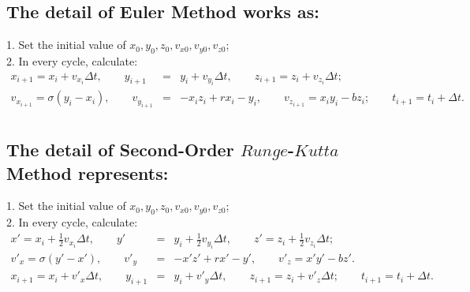 \documentclass{article}
\begin{document}
\subsection{The detail of Euler Method works as:}
1. Set the initial value of $x_0,y_0,z_0,v_{x0},v_{y0},v_{z0}$;\\
2. In every cycle, calculate:
\begin{eqnarray*}
x_{i+1} = x_{i}+v_{x_{i}}\Delta t,\qquad
y_{i+1} &=& y_{i}+v_{y_{i}}\Delta t,\qquad
z_{i+1} = z_{i}+v_{z_{i}}\Delta t;\\
v_{x_{i+1}} = \sigma (y_{i}-x_{i}),\qquad
v_{y_{i+1}} &=& -x_{i}z_{i}+rx_{i}-y_{i},\qquad
v_{z_{i+1}} = x_{i}y_{i}-bz_{i};\qquad
t_{i+1} = t_{i}+\Delta t.\\
\end{eqnarray*}

\subsection{\noindent The detail of Second-Order $Runge$-$Kutta$ Method represents:}
1. Set the initial value of $x_0,y_0,z_0,v_{x0},v_{y0},v_{z0}$;\\
2. In every cycle, calculate:
\begin{eqnarray*}
x' = x_{i} + \frac{1}{2}v_{x_{i}}\Delta t, \qquad y' &=& y_{i} + \frac{1}{2}v_{y_{i}}\Delta t, \qquad z' = z_{i} + \frac{1}{2}v_{z_{i}}\Delta t;\\
v'_x = \sigma (y'-x'), \qquad v'_y &=& -x'z'+rx'-y', \qquad v'_z = x'y'-bz'.\\
x_{i+1} = x_{i}+v'_{x}\Delta t,\qquad
y_{i+1} &=& y_{i}+v'_{y}\Delta t,\qquad
z_{i+1} = z_{i}+v'_{z}\Delta t;\qquad
t_{i+1} = t_{i}+\Delta t.\\
\end{eqnarray*}
\end{document}
